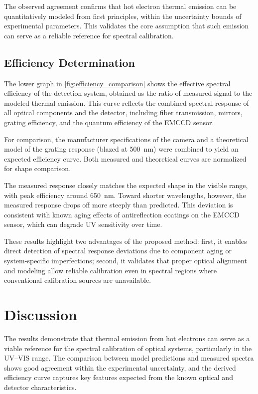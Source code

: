 \documentclass[
	parskip=half,
	a4paper,
]{scrarticle}
\begin{document}
The observed agreement confirms that hot electron thermal emission can be quantitatively modeled from first principles, within the uncertainty bounds of experimental parameters. This validates the core assumption that such emission can serve as a reliable reference for spectral calibration.

\subsection{Efficiency Determination}

The lower graph in \autoref{fig:efficiency_comparison} shows the effective spectral efficiency of the detection system, obtained as the ratio of measured signal to the modeled thermal emission. This curve reflects the combined spectral response of all optical components and the detector, including fiber transmission, mirrors, grating efficiency, and the quantum efficiency of the EMCCD sensor.

For comparison, the manufacturer specifications of the camera and a theoretical model of the grating response (blazed at \SI{500}{nm}) were combined to yield an expected efficiency curve. Both measured and theoretical curves are normalized for shape comparison.

The measured response closely matches the expected shape in the visible range, with peak efficiency around \SI{650}{nm}. Toward shorter wavelengths, however, the measured response drops off more steeply than predicted. This deviation is consistent with known aging effects of antireflection coatings on the EMCCD sensor, which can degrade UV sensitivity over time.

These results highlight two advantages of the proposed method: first, it enables direct detection of spectral response deviations due to component aging or system-specific imperfections; second, it validates that proper optical alignment and modeling allow reliable calibration even in spectral regions where conventional calibration sources are unavailable.

\section{Discussion}

The results demonstrate that thermal emission from hot electrons can serve as a viable reference for the spectral calibration of optical systems, particularly in the UV–VIS range. The comparison between model predictions and measured spectra shows good agreement within the experimental uncertainty, and the derived efficiency curve captures key features expected from the known optical and detector characteristics.
\end{document}
